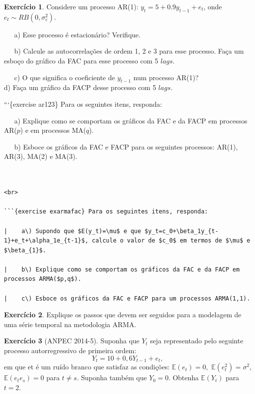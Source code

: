 \documentclass[
]{book}
\theoremstyle{definition}
\theoremstyle{definition}
\theoremstyle{definition}
\newtheorem{exercise}{Exercício}[chapter]
\theoremstyle{remark}
\begin{document}
\begin{exercise}
\protect\hypertarget{exr:ar1}{}{\label{exr:ar1} }Considere um processo AR(1):
\(y_t=5+0.9y_{t-1}+e_t\), onde \(e_t \sim RB(0,\sigma^2_e)\).

~~~a) Esse processo é estacionário? Verifique.

~~~b) Calcule as autocorrelações de ordem 1, 2 e 3 para esse processo. Faça um esboço do gráfico da FAC para esse processo com 5 \(lags\).

~~~c) O que significa o coeficiente de \(y_{t-1}\) num processo AR(1)?\\
\hspace*{0.333em}\hspace*{0.333em}\hspace*{0.333em}d) Faça um gráfico da FACP desse processo com 5 \(lags\).
\end{exercise}

```\{exercise ar123\} Para os seguintes itens, responda:

~~~a) Explique como se comportam os gráficos da FAC e da FACP em processos AR(\(p\)) e em processos MA(\(q\)).

~~~b) Esboce os gráficos da FAC e FACP para os seguintes processos: AR(1), AR(3), MA(2) e MA(3).

\begin{verbatim}


<br>

```{exercise exarmafac} Para os seguintes itens, responda:

|    a\) Supondo que $E(y_t)=\mu$ e que $y_t=c_0+\beta_1y_{t-1}+e_t+\alpha_1e_{t-1}$, calcule o valor de $c_0$ em termos de $\mu$ e $\beta_{1}$.

|    b\) Explique como se comportam os gráficos da FAC e da FACP em processos ARMA($p,q$).

|    c\) Esboce os gráficos da FAC e FACP para um processos ARMA(1,1).
\end{verbatim}

\begin{exercise}
\protect\hypertarget{exr:exarmamet}{}{\label{exr:exarmamet} }Explique os passos que devem ser seguidos para a modelagem de uma série temporal na metodologia ARMA.
\end{exercise}

\begin{exercise}[ANPEC 2014-5]
\protect\hypertarget{exr:a145}{}{\label{exr:a145} {} }Suponha que \(Y_t\) seja representado pelo seguinte processo autorregressivo de primeira ordem:
\[Y_t = 10 + 0,6 Y_{t-1} + e_t ,\]
em que et é um ruído branco que satisfaz as condições: \(\mathbb{E}(e_t)=0,\) \(\mathbb{E}(e_t^2)=\sigma^2\), \(\mathbb{E}(e_te_s)=0\) para \(t\neq s.\) Suponha também que \(Y_0=0\). Obtenha \(\mathbb{E}(Y_t)\) para \(t=2\).
\end{exercise}
\end{document}

